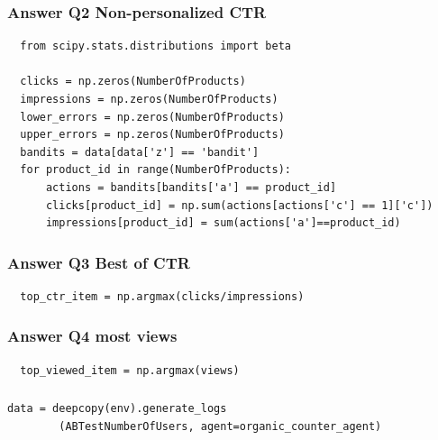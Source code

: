 \begin{frame}[fragile]
  \frametitle{Answer Q2 Non-personalized CTR}
\begin{tiny}
\begin{verbatim}
  from scipy.stats.distributions import beta

  clicks = np.zeros(NumberOfProducts)
  impressions = np.zeros(NumberOfProducts)
  lower_errors = np.zeros(NumberOfProducts)
  upper_errors = np.zeros(NumberOfProducts)
  bandits = data[data['z'] == 'bandit']
  for product_id in range(NumberOfProducts):
      actions = bandits[bandits['a'] == product_id]
      clicks[product_id] = np.sum(actions[actions['c'] == 1]['c'])
      impressions[product_id] = sum(actions['a']==product_id)
\end{verbatim}
\end{tiny}
\end{frame}

\begin{frame}[fragile]
  \frametitle{Answer Q3 Best of CTR}
\begin{verbatim}
  top_ctr_item = np.argmax(clicks/impressions)
\end{verbatim}
\end{frame}


\begin{frame}[fragile]
  \frametitle{Answer Q4 most views}
\begin{verbatim}
  top_viewed_item = np.argmax(views)
\end{verbatim}
\end{frame}




\begin{frame}[fragile]
  \frametitle{}
  \begin{small}
\begin{verbatim}
data = deepcopy(env).generate_logs
        (ABTestNumberOfUsers, agent=organic_counter_agent)
\end{verbatim}
\end{small}
\end{frame}




